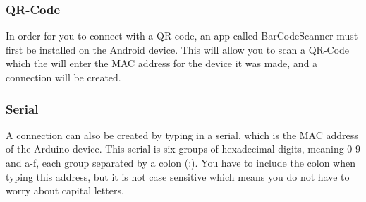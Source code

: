 \subsubsection{QR-Code}
In order for you to connect with a QR-code, an app called BarCodeScanner must first be installed on the Android device. This will allow you to scan a QR-Code which the will enter the MAC address for the device it was made, and a connection will be created.\\

\subsubsection{Serial}
A connection can also be created by typing in a serial, which is the MAC address of the Arduino device. This serial is six groups of hexadecimal digits, meaning 0-9 and a-f, each group separated by a colon (:). You have to include the colon when typing this address, but it is not case sensitive which means you do not have to worry about capital letters.\\

